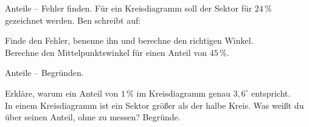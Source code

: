 \begin{aufgabe}{Anteile -- Fehler finden.}
Für ein Kreisdiagramm soll der Sektor für $24\,\%$ gezeichnet werden. Ben schreibt auf:
\begin{teile}
\teil Finde den Fehler, benenne ihn und berechne den richtigen Winkel. \\[12pt]
\teil Berechne den Mittelpunktswinkel für einen Anteil von $45\,\%$. \leerfeld[$^\circ$]
\end{teile}
\end{aufgabe}

\begin{aufgabe}{Anteile -- Begründen.}
\begin{teile}
\teil Erkläre, warum ein Anteil von $1\,\%$ im Kreisdiagramm genau $3{,}6^\circ$ entspricht. \\[12pt]
\teil In einem Kreisdiagramm ist ein Sektor größer als der halbe Kreis. Was weißt du über seinen Anteil, ohne zu messen? Begründe. \\[12pt]
\end{teile}
\end{aufgabe}
